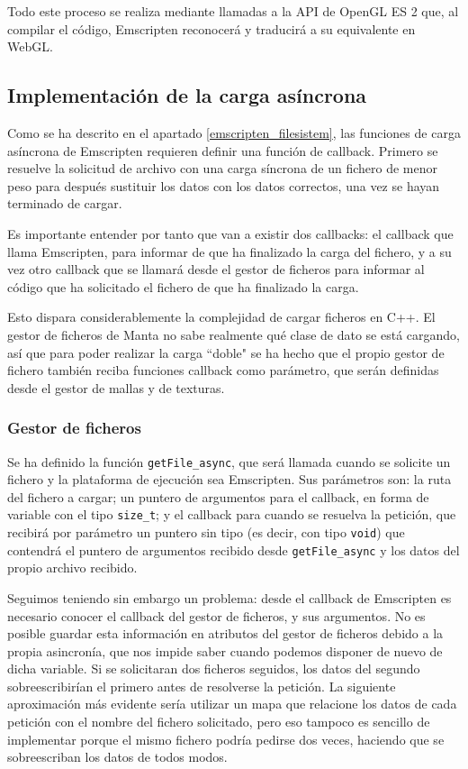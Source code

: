 Todo este proceso se realiza mediante llamadas a la API de OpenGL ES 2 que, al compilar el código, Emscripten reconocerá y traducirá a su equivalente en WebGL.


\subsection{Implementación de la carga asíncrona}
Como se ha descrito en el apartado \ref{emscripten_filesistem}, las funciones de carga asíncrona de Emscripten requieren definir una función de callback. Primero se resuelve la solicitud de archivo con una carga síncrona de un fichero de menor peso para después sustituir los datos con los datos correctos, una vez se hayan terminado de cargar.

Es importante entender por tanto que van a existir dos callbacks: el callback que llama Emscripten, para informar de que ha finalizado la carga del fichero, y a su vez otro callback que se llamará desde el gestor de ficheros para informar al código que ha solicitado el fichero de que ha finalizado la carga.

Esto dispara considerablemente la complejidad de cargar ficheros en C++. El gestor de ficheros de Manta no sabe realmente qué clase de dato se está cargando, así que para poder realizar la carga ``doble" se ha hecho que el propio gestor de fichero también reciba funciones callback como parámetro, que serán definidas desde el gestor de mallas y de texturas.

\subsubsection{Gestor de ficheros}
Se ha definido la función \texttt{getFile\_async}, que será llamada cuando se solicite un fichero y la plataforma de ejecución sea Emscripten. Sus parámetros son: la ruta del fichero a cargar; un puntero de argumentos para el callback, en forma de variable con el tipo \texttt{size\_t}; y el callback para cuando se resuelva la petición, que recibirá por parámetro un puntero sin tipo (es decir, con tipo \texttt{void}) que contendrá el puntero de argumentos recibido desde \texttt{getFile\_async} y los datos del propio archivo recibido.

Seguimos teniendo sin embargo un problema: desde el callback de Emscripten es necesario conocer el callback del gestor de ficheros, y sus argumentos. No es posible guardar esta información en atributos del gestor de ficheros debido a la propia asincronía, que nos impide saber cuando podemos disponer de nuevo de dicha variable. Si se solicitaran dos ficheros seguidos, los datos del segundo sobreescribirían el primero antes de resolverse la petición. La siguiente aproximación más evidente sería utilizar un mapa que relacione los datos de cada petición con el nombre del fichero solicitado, pero eso tampoco es sencillo de implementar porque el mismo fichero podría pedirse dos veces, haciendo que se sobreescriban los datos de todos modos.

